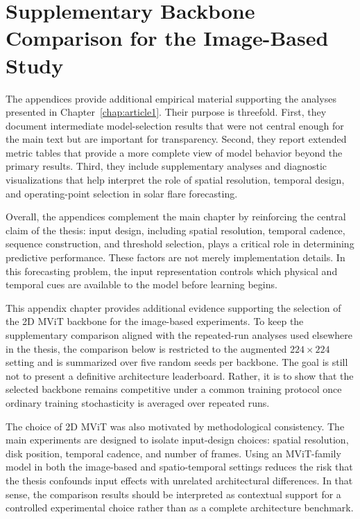 \anglais

\let\origcleardoublepage\cleardoublepage
\let\cleardoublepage\clearpage

\chapter{Supplementary Backbone Comparison for the Image-Based Study}
\label{app:supplementary_empirical_analysis}
\label{app:backbone_screening}

The appendices provide additional empirical material supporting the analyses presented in Chapter~\ref{chap:article1}. Their purpose is threefold. First, they document intermediate model-selection results that were not central enough for the main text but are important for transparency. Second, they report extended metric tables that provide a more complete view of model behavior beyond the primary results. Third, they include supplementary analyses and diagnostic visualizations that help interpret the role of spatial resolution, temporal design, and operating-point selection in solar flare forecasting.

Overall, the appendices complement the main chapter by reinforcing the central claim of the thesis: input design, including spatial resolution, temporal cadence, sequence construction, and threshold selection, plays a critical role in determining predictive performance. These factors are not merely implementation details. In this forecasting problem, the input representation controls which physical and temporal cues are available to the model before learning begins.

This appendix chapter provides additional evidence supporting the selection of the 2D MViT backbone for the image-based experiments. To keep the supplementary comparison aligned with the repeated-run analyses used elsewhere in the thesis, the comparison below is restricted to the augmented $224\times224$ setting and is summarized over five random seeds per backbone. The goal is still not to present a definitive architecture leaderboard. Rather, it is to show that the selected backbone remains competitive under a common training protocol once ordinary training stochasticity is averaged over repeated runs.

The choice of 2D MViT was also motivated by methodological consistency. The main experiments are designed to isolate input-design choices: spatial resolution, disk position, temporal cadence, and number of frames. Using an MViT-family model in both the image-based and spatio-temporal settings reduces the risk that the thesis confounds input effects with unrelated architectural differences. In that sense, the comparison results should be interpreted as contextual support for a controlled experimental choice rather than as a complete architecture benchmark.

